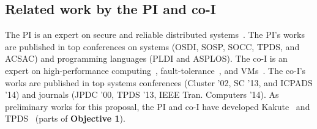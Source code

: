 \vspace{-.15in}\subsection{Related work by the PI and co-I} 
\label{sec:my-work}\vspace{-.075in}
% 

The PI is an expert on secure and reliable distributed 
systems~\cite{smt:cacm, cui:tern:osdi10, peregrine:sosp11,
parrot:sosp13, crane:sosp15, tripod:apsys16, kakute:acsac17, 
confluence:tpds17}. The PI's works are published in top conferences on systems 
(OSDI, SOSP, SOCC, TPDS, and ACSAC) and programming languages (PLDI and ASPLOS). 
The co-I is an expert on high-performance 
computing~\cite{powerrock,hwang,jessica,cheung,khokhar}, fault-tolerance~\cite{ 
sheng,shengdi1}, and VMs~\cite{rhymes,shengdi,jessica2}. The 
co-I's works are published in top systems conferences (Cluster '02, SC '13, 
and ICPADS '14) and journals (JPDC '00, TPDS '13, IEEE Tran. Computers '14). As 
preliminary works for this proposal, the PI and co-I have developed 
Kakute~\cite{kakute:acsac17} and TPDS~\cite{confluence:tpds17} (parts of 
\textbf{Objective 1}). 



